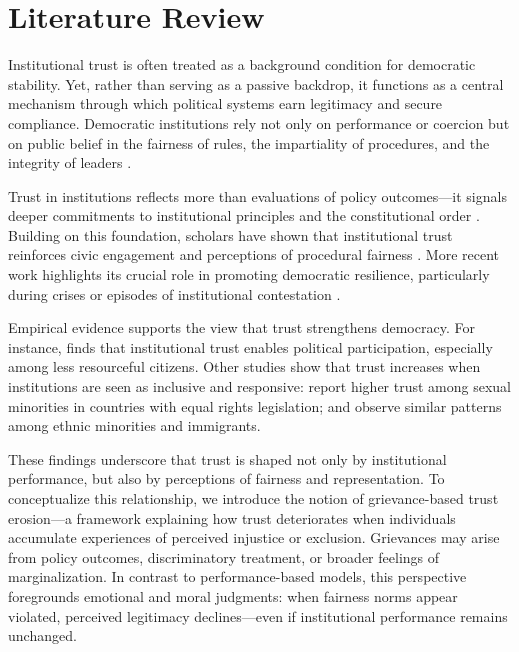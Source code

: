 \documentclass{article}
\begin{document}
\section{Literature Review}

Institutional trust is often treated as a background condition for democratic stability. Yet, rather than serving as a passive backdrop, it functions as a central mechanism through which political systems earn legitimacy and secure compliance. Democratic institutions rely not only on performance or coercion but on public belief in the fairness of rules, the impartiality of procedures, and the integrity of leaders \parencite{levi_legitimating_2009, citrin_political_2018}.

Trust in institutions reflects more than evaluations of policy outcomes—it signals deeper commitments to institutional principles and the constitutional order \parencite{easton_systems_1965}. Building on this foundation, scholars have shown that institutional trust reinforces civic engagement and perceptions of procedural fairness \parencite{tyler_why_2006}. More recent work highlights its crucial role in promoting democratic resilience, particularly during crises or episodes of institutional contestation \parencite{zmerli_handbook_2017, devine_stability_2024}.

Empirical evidence supports the view that trust strengthens democracy. For instance, \textcite{marien_measuring_2011} finds that institutional trust enables political participation, especially among less resourceful citizens. Other studies show that trust increases when institutions are seen as inclusive and responsive: \textcite{mann_sexual_2022} report higher trust among sexual minorities in countries with equal rights legislation; \textcite{wilkes_immigration_2019} and \textcite{tyrberg_impact_2024} observe similar patterns among ethnic minorities and immigrants.

These findings underscore that trust is shaped not only by institutional performance, but also by perceptions of fairness and representation. To conceptualize this relationship, we introduce the notion of grievance-based trust erosion—a framework explaining how trust deteriorates when individuals accumulate experiences of perceived injustice or exclusion. Grievances may arise from policy outcomes, discriminatory treatment, or broader feelings of marginalization. In contrast to performance-based models, this perspective foregrounds emotional and moral judgments: when fairness norms appear violated, perceived legitimacy declines—even if institutional performance remains unchanged.
\end{document}
